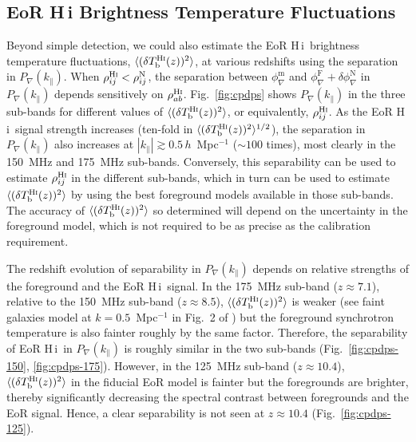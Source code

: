 \documentclass[
reprint,
superscriptaddress,
amsmath,
amssymb,
aps,
prd
]{revtex4-1}
\newcommand{\HI}{H\,{\sc i}}
\begin{document}
\begin{figure}[htb]
\end{figure}

\subsection{EoR H\,{\sc i} Brightness Temperature Fluctuations} \label{sec:Tb-variance}

Beyond simple detection, we could also estimate the EoR \HI\ brightness temperature fluctuations, $\langle(\delta T_\textrm{b}^\textrm{H{\sc i}}(z))^2\rangle$, at various redshifts using the separation in $P_\nabla(k_\parallel)$. When $\rho_{ij}^\textrm{H{\sc i}} < \rho_{ij}^\textrm{N}$, the separation between $\phi_\nabla^\textrm{m}$ and $\phi_\nabla^\textrm{F} + \delta\phi_\nabla^\textrm{N}$ in $P_\nabla(k_\parallel)$ depends sensitively on $\rho_{ab}^\textrm{H{\sc i}}$. Fig.~\ref{fig:cpdps} shows $P_\nabla(k_\parallel)$ in the three sub-bands for different values of $\langle(\delta T_\textrm{b}^\textrm{H{\sc i}}(z))^2\rangle$, or equivalently, $\rho_{ij}^\textrm{H{\sc i}}$. As the EoR \HI\ signal strength increases (ten-fold in $\langle(\delta T_\textrm{b}^\textrm{H{\sc i}}(z))^2\rangle^{1/2}$), the separation in $P_\nabla(k_\parallel)$ also increases at $|k_\parallel| \gtrsim 0.5\,h$~Mpc$^{-1}$ ($\sim 100$ times), most clearly in the 150~MHz and 175~MHz sub-bands. Conversely, this separability can be used to estimate $\rho_{ij}^\textrm{H{\sc i}}$ in the different sub-bands, which in turn can be used to estimate $\langle(\delta T_\textrm{b}^\textrm{H{\sc i}}(z))^2\rangle$ by using the best foreground models available in those sub-bands. The accuracy of $\langle(\delta T_\textrm{b}^\textrm{H{\sc i}}(z))^2\rangle$ so determined will depend on the uncertainty in the foreground model, which is not required to be as precise as the calibration requirement.

The redshift evolution of separability in $P_\nabla(k_\parallel)$ depends on relative strengths of the foreground and the EoR \HI\ signal. In the 175~MHz sub-band ($z\approx 7.1$), relative to the 150~MHz sub-band ($z\approx 8.5$), $\langle(\delta T_\textrm{b}^\textrm{H{\sc i}}(z))^2\rangle$ is weaker (see {\sc faint galaxies} model at $k=0.5$~Mpc$^{-1}$ in Fig.~2 of \cite{gre17b}) but the foreground synchrotron temperature is also fainter roughly by the same factor. Therefore, the separability of EoR \HI\ in $P_\nabla(k_\parallel)$ is roughly similar in the two sub-bands (Fig.~\ref{fig:cpdps-150}, \ref{fig:cpdps-175}). However, in the 125~MHz sub-band ($z\approx 10.4$), $\langle(\delta T_\textrm{b}^\textrm{H{\sc i}}(z))^2\rangle$ in the fiducial EoR model is fainter but the foregrounds are brighter, thereby significantly decreasing the spectral contrast between foregrounds and the EoR signal. Hence, a clear separability is not seen at $z\approx 10.4$ (Fig.~\ref{fig:cpdps-125}).
\end{document}
